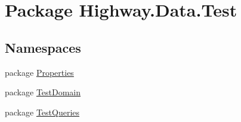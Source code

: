 \hypertarget{namespace_highway_1_1_data_1_1_test}{\section{Package Highway.\-Data.\-Test}
\label{namespace_highway_1_1_data_1_1_test}
}
\subsection*{Namespaces}
\begin{DoxyCompactItemize}
\item 
package \hyperlink{namespace_highway_1_1_data_1_1_test_1_1_properties}{Properties}
\item 
package \hyperlink{namespace_highway_1_1_data_1_1_test_1_1_test_domain}{Test\-Domain}
\item 
package \hyperlink{namespace_highway_1_1_data_1_1_test_1_1_test_queries}{Test\-Queries}
\end{DoxyCompactItemize}
